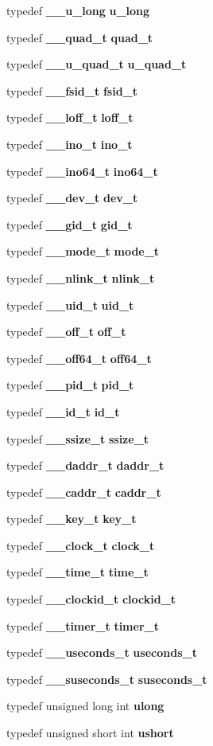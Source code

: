 \begin{DoxyCompactItemize}
typedef {\bf \_\-\_\-u\_\-long} {\bf u\_\-long}
\item 
typedef {\bf \_\-\_\-quad\_\-t} {\bf quad\_\-t}
\item 
typedef {\bf \_\-\_\-u\_\-quad\_\-t} {\bf u\_\-quad\_\-t}
\item 
typedef {\bf \_\-\_\-fsid\_\-t} {\bf fsid\_\-t}
\item 
typedef {\bf \_\-\_\-loff\_\-t} {\bf loff\_\-t}
\item 
typedef {\bf \_\-\_\-ino\_\-t} {\bf ino\_\-t}
\item 
typedef {\bf \_\-\_\-ino64\_\-t} {\bf ino64\_\-t}
\item 
typedef {\bf \_\-\_\-dev\_\-t} {\bf dev\_\-t}
\item 
typedef {\bf \_\-\_\-gid\_\-t} {\bf gid\_\-t}
\item 
typedef {\bf \_\-\_\-mode\_\-t} {\bf mode\_\-t}
\item 
typedef {\bf \_\-\_\-nlink\_\-t} {\bf nlink\_\-t}
\item 
typedef {\bf \_\-\_\-uid\_\-t} {\bf uid\_\-t}
\item 
typedef {\bf \_\-\_\-off\_\-t} {\bf off\_\-t}
\item 
typedef {\bf \_\-\_\-off64\_\-t} {\bf off64\_\-t}
\item 
typedef {\bf \_\-\_\-pid\_\-t} {\bf pid\_\-t}
\item 
typedef {\bf \_\-\_\-id\_\-t} {\bf id\_\-t}
\item 
typedef {\bf \_\-\_\-ssize\_\-t} {\bf ssize\_\-t}
\item 
typedef {\bf \_\-\_\-daddr\_\-t} {\bf daddr\_\-t}
\item 
typedef {\bf \_\-\_\-caddr\_\-t} {\bf caddr\_\-t}
\item 
typedef {\bf \_\-\_\-key\_\-t} {\bf key\_\-t}
\item 
typedef {\bf \_\-\_\-clock\_\-t} {\bf clock\_\-t}
\item 
typedef {\bf \_\-\_\-time\_\-t} {\bf time\_\-t}
\item 
typedef {\bf \_\-\_\-clockid\_\-t} {\bf clockid\_\-t}
\item 
typedef {\bf \_\-\_\-timer\_\-t} {\bf timer\_\-t}
\item 
typedef {\bf \_\-\_\-useconds\_\-t} {\bf useconds\_\-t}
\item 
typedef {\bf \_\-\_\-suseconds\_\-t} {\bf suseconds\_\-t}
\item 
typedef unsigned long int {\bf ulong}
\item 
typedef unsigned short int {\bf ushort}

\end{DoxyCompactItemize}
